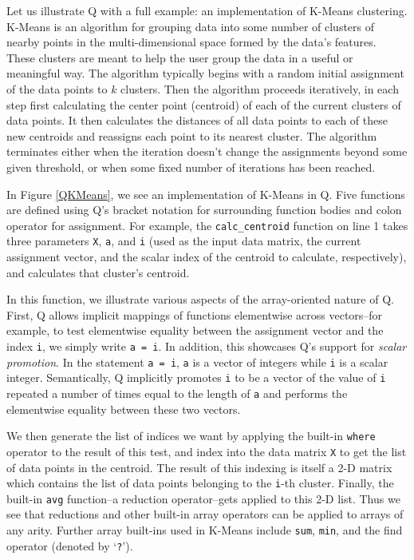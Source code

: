 \documentclass[preprint]{sigplanconf}
\begin{document}
Let us illustrate Q with a full example: an implementation of K-Means
clustering.  K-Means is an algorithm for grouping data into some number of
clusters of nearby points in the multi-dimensional space formed by the
data's features.  These clusters are meant to help the user group the data
in a useful or meaningful way.  The
algorithm typically begins with a random initial assignment of the data points
to $k$ clusters. Then the algorithm proceeds iteratively, in each step first
calculating the center point (centroid) of each of the current clusters of data
points.  It then calculates the distances of all data points to each of these
new centroids and reassigns each point to its nearest cluster.  The algorithm
terminates either when the iteration doesn't change the assignments beyond some
given threshold, or when some fixed number of iterations has been reached.

In Figure \ref{QKMeans}, we see an implementation of K-Means in Q.  Five
functions are defined using Q's bracket notation for surrounding function
bodies and colon operator for assignment.  For example, the
\texttt{calc\_centroid} function on line 1 takes three parameters
\texttt{X}, \texttt{a}, and \texttt{i} (used as the input data matrix, the
current assignment vector, and the scalar index of the centroid to calculate,
respectively), and calculates that cluster's centroid.

In this function, we illustrate various aspects of the array-oriented nature of
Q. First, Q allows implicit mappings of functions elementwise across
vectors--for example, to test elementwise equality between the assignment
vector and the index \texttt{i}, we simply write \texttt{a = i}.  In addition,
this showcases Q's support for \emph{scalar promotion}.  In the statement
\texttt{a = i}, \texttt{a} is a vector of integers while \texttt{i} is a scalar
integer.  Semantically, Q implicitly promotes \texttt{i} to be a vector of the
value of \texttt{i} repeated a number of times equal to the length of \texttt{a}
and performs the elementwise equality between these two vectors.

We then generate the list of indices we want by applying the built-in
\texttt{where} operator to the result of this test, and index into the data
matrix \texttt{X} to get the list of data points in the centroid. The result of
this indexing is itself a 2-D matrix which contains the list of data points
belonging to the \texttt{i}-th cluster. Finally, the built-in \texttt{avg}
function--a reduction operator--gets applied to this 2-D list. Thus we see that
reductions and other built-in array operators can be applied to arrays of any
arity.  Further array built-ins used in K-Means include \texttt{sum},
\texttt{min}, and the find operator (denoted by `\texttt{?}').
\end{document}
